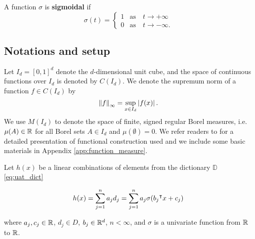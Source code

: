 

\begin{definition}\label{def:sigmoidal}
    A function $\sigma$ is \textbf{sigmoidal} if
    \begin{equation}
        \sigma(t) =
        \begin{cases}
            1 & \text{as} \quad t \to +\infty \\
            0 & \text{as} \quad t \to -\infty.
        \end{cases}
    \end{equation}
\end{definition}

\subsection*{Notations and setup}

Let $I_d = [0,1]^d$ denote the $d$-dimensional unit cube, and the space of
continuous functions over $I_d$ is denoted by $C(I_d)$. We denote the supremum
norm of a function $f \in C(I_d)$ by
\begin{equation}
    \label{def:sup_norm}
    \left\| f \right\|_{\infty} = \sup_{x\in I_d} \left| f(x) \right|.
\end{equation}
We use $M(I_d)$ to denote the space of finite, signed regular Borel measures,
i.e. $\mu(A) \in \mathbb{R}$ for all Borel sets $A \in I_d$ and $\mu(\emptyset)= 0$. We
refer readers to \cite{rudinFunctionalAnalysis1991,
rudinRealComplexAnalysis1987} for a detailed presentation of functional
construction used and we include some basic materials in Appendix
\ref{app:function_measure}.

Let $h(x)$ be a linear combinations of elements from the dictionary $\mathbb{D}$
\eqref{eq:uat_dict}

\begin{equation}
    \label{eq:sum_sigma}
    h(x) = \sum_{j=1}^n a_j d_j = \sum_{j=1}^n a_j \sigma(b_j{}^{\intercal} x + c_j)
\end{equation}

where $a_j, c_j \in \mathbb{R}$, $d_j \in D$,  $b_j \in \mathbb{R}^d$, $n < \infty$, and
$\sigma$ is a univariate function from $\mathbb{R}$ to $\mathbb{R}$.
 
